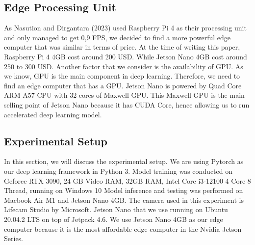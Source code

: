 \documentclass[conference]{IEEEtran}
\begin{document}
\subsection{Edge Processing Unit}
As Nasution and Dirgantara (2023) used Raspberry Pi 4 as their processing unit and only managed to get 0,9 FPS, we decided to find a more powerful edge computer that was similar in terms of price. At the time of writing this paper, Raspberry Pi 4 4GB cost around 200 USD. While Jetson Nano 4GB cost around 250 to 300 USD.
Another factor that we consider is the availability of GPU. As we know, GPU is the main component in deep learning. Therefore, we need to find an edge computer that has a GPU.
Jetson Nano is powered by Quad Core ARM-A57 CPU with 32 cores of Maxwell GPU. This Maxwell GPU is the main selling point of Jetson Nano because it has CUDA Core, hence allowing us to run accelerated deep learning model.

\subsection{Experimental Setup}
In this section, we will discuss  the experimental setup. We are using Pytorch as our deep learning framework in Python  3.
Model training was conducted on Geforce RTX 3090, 24 GB Video RAM, 32GB RAM, Intel Core i3-12100 4 Core 8 Thread, running on Windows 10
Model inference and testing was performed on Macbook Air M1 and Jetson Nano 4GB. The camera used in this experiment is Lifecam Studio by Microsoft.
Jetson Nano that we use running on Ubuntu 20.04.2 LTS on top of Jetpack 4.6. We use Jetson Nano 4GB as our edge computer because it is the most affordable edge computer in the Nvidia Jetson Series.
\end{document}

